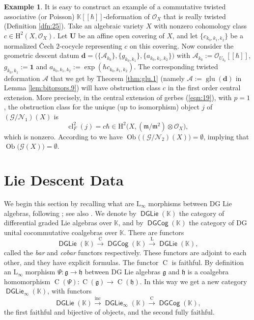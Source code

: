 \documentclass[a4paper, 10pt]{amsart}
\theoremstyle{definition}
\newtheorem{exa}[equation]{Example}
\numberwithin{equation}{section}
\newcommand{\xar}{\xrightarrow}
\newcommand{\opn}{\operatorname}
\newcommand{\cat}[1]{\operatorname{\mathsf{#1}}}
\newcommand{\mfrak}[1]{\mathfrak{#1}}
\newcommand{\mcal}[1]{\mathcal{#1}}
\newcommand{\mrm}[1]{\mathrm{#1}}
\newcommand{\mbb}[1]{\mathbb{#1}}
\newcommand{\bsym}[1]{\boldsymbol{#1}}
\newcommand{\ot}{\otimes}
\newcommand{\K}{\mbb{K}}
\newcommand{\g}{\mfrak{g}}
\newcommand{\m}{\mfrak{m}}
\newcommand{\h}{\mfrak{h}}
\newcommand{\gerbe}[1]{\bsym{\mcal{#1}}}
\begin{document}
\begin{exa} \label{exa:18}
It is easy to construct an example of a commutative twisted associative (or
Poisson) $\K[[\hbar]]$-deformation of $\mcal{O}_X$ that is really
twisted (Definition \ref{dfn:25}). Take an algebraic variety $X$ with nonzero
cohomology class $c \in \mrm{H}^2(X, \mcal{O}_X)$. 
Let $\bsym{U}$ be an affine open covering of $X$, and let
$\{ c_{k_0, k_1, k_2} \}$ be a normalized \v{C}ech $2$-cocycle representing $c$
on this covering. Now consider the geometric descent datum
$\bsym{d} = \bigl( \{ \mcal{A}_{k_0} \}, \{ g_{k_0, k_1} \}, 
\{ a_{k_0, k_1, k_2} \} \bigr)$
with $\mcal{A}_{k_0} := \mcal{O}_{U_{k_0}}[[\hbar]]$, 
$g_{k_0, k_1} := \bsym{1}$ and
$a_{k_0, k_1, k_2} := \opn{exp}(\hbar c_{k_0, k_1, k_2})$.
The corresponding twisted deformation $\gerbe{A}$ that we get by Theorem
\ref{thm:glu.1} (namely $\gerbe{A} := \opn{glu}(\bsym{d})$ in Lemma
\ref{lem:bitorsors.9}) will have obstruction
class $c$ in the first order central extension.
More precisely, in the central extension of gerbes (\ref{eqn:19}),
with $p = 1$, the obstruction class for the unique (up to isomorphism)
object $j$ of $(\gerbe{G} / \gerbe{N}_1)(X)$ is
\[ \opn{cl}^2_{F}(j) = c \hbar 
\in \mrm{H}^2 \bigl( X, 
(\m / \m^{2}) \ot \mcal{O}_X \bigr) , \]
which is nonzero. According to \cite[Theorem 4.17]{Ye4} we have
$\opn{Ob} \bigl( (\gerbe{G} / \gerbe{N}_2)(X) \bigr) = \emptyset$, 
implying that 
$\opn{Ob} \bigl( \gerbe{G}(X) \bigr) = \emptyset$. 
\end{exa}





\section{Lie Descent Data}
\label{sec:Lie-desc}

We begin this section by recalling what are $\mrm{L}_{\infty}$ morphisms
between DG Lie algebras,
following \cite[Sections 7-8]{Ye7}; see also \cite{Ko1, Hi2, CKTB}.
We denote by $\cat{DGLie} (\K)$ the category of differential graded Lie algebras
over $\K$, and by $\cat{DGCog}(\K)$ the category of DG unital cocommutative
coalgebras over $\K$. There are functors 
\[ \cat{DGLie}(\K) \xar{\opn{C}} \cat{DGCog}(\K) \xar{\opn{L}}
\cat{DGLie}(\K) , \]
called the {\em bar} and {\em cobar} functors respectively. 
These functors are adjoint to each other, and they have explicit formulas. 
The functor $\opn{C}$ is faithful.
By definition an $\mrm{L}_{\infty}$ morphism 
$\Psi : \g \to \h$ between DG Lie algebras $\g$ and $\h$
is a coalgebra homomorphism $\opn{C}(\Psi) : \opn{C}(\g) \to \opn{C}(\h)$.
In this way we get a new category $\cat{DGLie}_{\infty}(\K)$, with
functors 
\[ \cat{DGLie} (\K) \xar{\opn{inc}} \cat{DGLie}_{\infty}(\K)
\xar{\opn{C}} \cat{DGCog}(\K) , \]
the first faithful and bijective of objects, and the second fully faithful.
\end{document}
